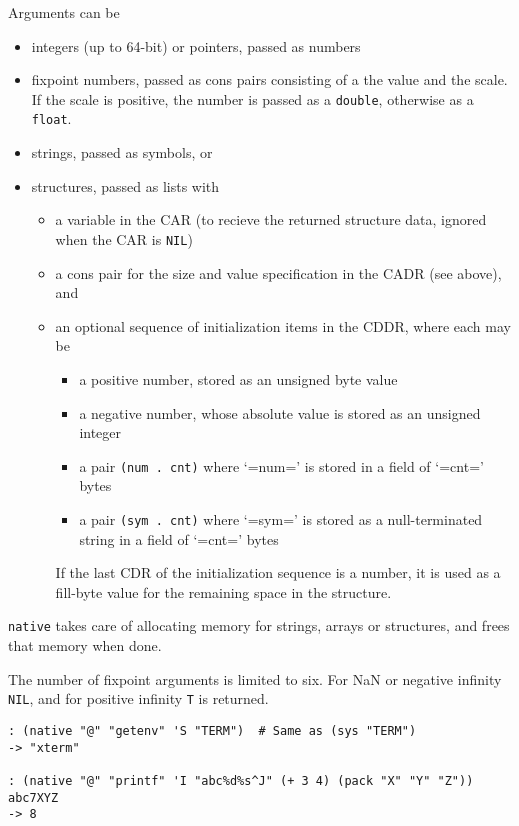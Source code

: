 {{{{{{{Arguments can be

\begin{itemize}
\item integers (up to 64-bit) or pointers, passed as numbers
\item fixpoint numbers, passed as cons pairs consisting of a the value and
   the scale. If the scale is positive, the number is passed as a
   \texttt{double}, otherwise as a \texttt{float}.
\item strings, passed as symbols, or
\item structures, passed as lists with
\begin{itemize}
\item a variable in the CAR (to recieve the returned structure data,
      ignored when the CAR is \texttt{NIL})
\item a cons pair for the size and value specification in the CADR (see
      above), and
\item an optional sequence of initialization items in the CDDR, where
      each may be
\begin{itemize}
\item a positive number, stored as an unsigned byte value
\item a negative number, whose absolute value is stored as an
         unsigned integer
\item a pair \texttt{(num . cnt)} where `=num=' is stored in a field of
         `=cnt=' bytes
\item a pair \texttt{(sym . cnt)} where `=sym=' is stored as a
         null-terminated string in a field of `=cnt=' bytes
\end{itemize}
If the last CDR of the initialization sequence is a number, it is
      used as a fill-byte value for the remaining space in the
      structure.
\end{itemize}
\end{itemize}

\texttt{native} takes care of allocating memory for strings, arrays or
structures, and frees that memory when done.

The number of fixpoint arguments is limited to six. For NaN or negative
infinity \texttt{NIL}, and for positive infinity \texttt{T} is returned.


\begin{verbatim}
: (native "@" "getenv" 'S "TERM")  # Same as (sys "TERM")
-> "xterm"

: (native "@" "printf" 'I "abc%d%s^J" (+ 3 4) (pack "X" "Y" "Z"))
abc7XYZ
-> 8


\end{verbatim}}}}}}}}
